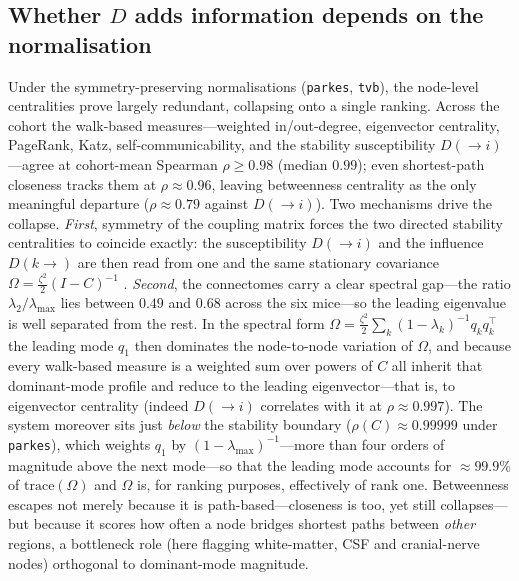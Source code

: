 \documentclass[11pt,a4paper]{article}
\newcommand{\Dto}{D(\!\to\! i)}
\newcommand{\Dfrom}{D(k\!\to\!)}
\newcommand{\rhoC}{\rho(C)}
\begin{document}
\subsection{Whether $D$ adds information depends on the normalisation}
Under the symmetry-preserving normalisations (\texttt{parkes}, \texttt{tvb}), the node-level
centralities prove largely redundant, collapsing onto a single ranking. Across the cohort the
walk-based measures---weighted in/out-degree, eigenvector centrality, PageRank, Katz,
self-communicability, and the stability susceptibility $\Dto$---agree at cohort-mean Spearman
$\rho\ge 0.98$ (median $0.99$); even shortest-path closeness tracks them at $\rho\approx 0.96$,
leaving betweenness centrality \citep{rubinov2010} as the only meaningful departure
($\rho\approx 0.79$ against $\Dto$). Two mechanisms drive the collapse. \emph{First}, symmetry of the
coupling matrix forces the two directed stability centralities to coincide exactly: the
susceptibility $\Dto$ and the influence $\Dfrom$ are then read from one and the same stationary
covariance $\Omega=\tfrac{\zeta^2}{2}(I-C)^{-1}$ \citep{liao_lizier2026}. \emph{Second}, the
connectomes carry a clear spectral gap---the ratio $\lambda_2/\lambda_{\max}$ lies between $0.49$ and
$0.68$ across the six mice---so the leading eigenvalue is well separated from the rest. In the
spectral form $\Omega=\tfrac{\zeta^2}{2}\sum_k(1-\lambda_k)^{-1}q_k q_k^{\top}$ the leading mode
$q_1$ then dominates the node-to-node variation of $\Omega$, and because every walk-based measure is
a weighted sum over powers of $C$ \citep{schwarze2021} all inherit that dominant-mode profile and
reduce to the leading eigenvector---that is, to eigenvector centrality (indeed $\Dto$ correlates with
it at $\rho\approx 0.997$). The system moreover sits just \emph{below} the stability boundary
($\rhoC\approx0.99999$ under \texttt{parkes}), which weights $q_1$ by $(1-\lambda_{\max})^{-1}$---more than
four orders of magnitude above the next mode---so that the leading mode accounts for $\approx 99.9\%$
of $\mathrm{trace}(\Omega)$ and $\Omega$ is, for ranking purposes, effectively of rank one.
Betweenness escapes not merely because it is path-based---closeness is too, yet still collapses---but
because it scores how often a node bridges shortest paths between \emph{other} regions, a bottleneck
role (here flagging white-matter, CSF and cranial-nerve nodes) orthogonal to dominant-mode magnitude.
\end{document}

